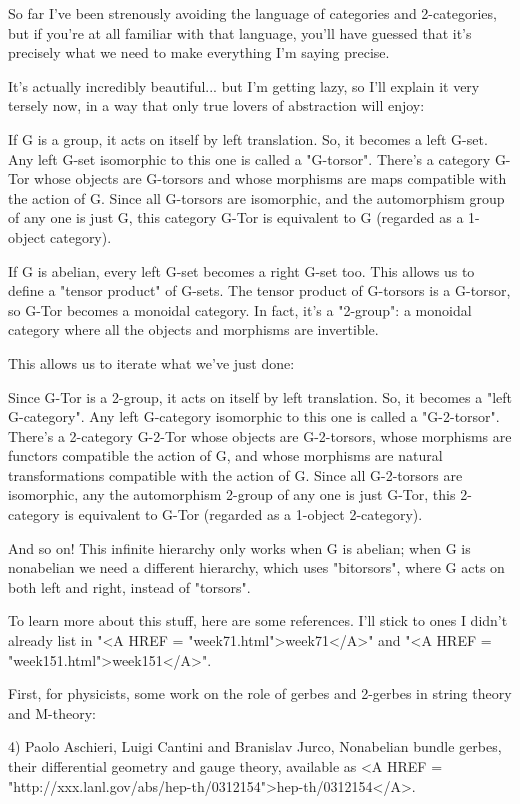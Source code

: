 So far I've been strenously avoiding the language of categories and 
2-categories, but if you're at all familiar with that language, you'll
have guessed that it's precisely what we need to make everything I'm 
saying precise.

It's actually incredibly beautiful... but I'm getting lazy, so I'll 
explain it very tersely now, in a way that only true lovers of abstraction 
will enjoy:

If G is a group, it acts on itself by left translation.  So, it
becomes a left G-set.  Any left G-set isomorphic to this one is called
a "G-torsor".  There's a category G-Tor whose objects are
G-torsors and whose morphisms are maps compatible with the action of
G.  Since all G-torsors are isomorphic, and the automorphism group of
any one is just G, this category G-Tor is equivalent to G (regarded as
a 1-object category).

If G is abelian, every left G-set becomes a right G-set too.  This
allows us to define a "tensor product" of G-sets.  The
tensor product of G-torsors is a G-torsor, so G-Tor becomes a monoidal
category.  In fact, it's a "2-group": a monoidal category
where all the objects and morphisms are invertible.

This allows us to iterate what we've just done:

Since G-Tor is a 2-group, it acts on itself by left translation.  So,
it becomes a "left G-category".  Any left G-category
isomorphic to this one is called a "G-2-torsor".  There's a
2-category G-2-Tor whose objects are G-2-torsors, whose morphisms are
functors compatible the action of G, and whose morphisms are natural
transformations compatible with the action of G.  Since all
G-2-torsors are isomorphic, any the automorphism 2-group of any one is
just G-Tor, this 2-category is equivalent to G-Tor (regarded as a
1-object 2-category).

And so on!  This infinite hierarchy only works when G is abelian;
when G is nonabelian we need a different hierarchy, which uses 
"bitorsors", where G acts on both left and right, instead 
of "torsors".  

To learn more about this stuff, here are some references.  I'll stick
to ones I didn't already list in "<A HREF =
"week71.html">week71</A>" and "<A HREF =
"week151.html">week151</A>".

First, for physicists, some work on the role of gerbes and 2-gerbes in 
string theory and M-theory:

4) Paolo Aschieri, Luigi Cantini and Branislav Jurco, Nonabelian bundle
gerbes, their differential geometry and gauge theory, available as 
<A HREF = "http://xxx.lanl.gov/abs/hep-th/0312154">hep-th/0312154</A>.

